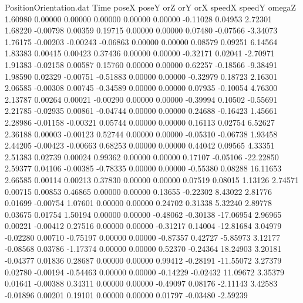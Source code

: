 \begin{filecontents}{PositionOrientation.dat}
Time poseX poseY orZ orY orX speedX speedY omegaZ
   1.60980    0.00000    0.00000     0.00000    0.00000    0.00000   -0.11028    0.04953    2.72301
   1.68220   -0.00798    0.00359     0.19715    0.00000    0.00000    0.07480   -0.07566   -3.34073
   1.76175   -0.00203   -0.00243    -0.06863    0.00000    0.00000    0.08579    0.09251    6.14564
   1.83383    0.00415    0.00423     0.37436    0.00000    0.00000   -0.32171    0.02041   -2.70971
   1.91383   -0.02158    0.00587     0.15760    0.00000    0.00000    0.62257   -0.18566   -9.38491
   1.98590    0.02329   -0.00751    -0.51883    0.00000    0.00000   -0.32979    0.18723    2.16301
   2.06585   -0.00308    0.00745    -0.34589    0.00000    0.00000    0.07935   -0.10054    4.76300
   2.13787    0.00264    0.00021    -0.00290    0.00000    0.00000   -0.39994    0.10502   -0.55691
   2.21785   -0.02935    0.00861    -0.04744    0.00000    0.00000    0.24688   -0.16423    1.45661
   2.28986   -0.01158   -0.00321     0.05744    0.00000    0.00000    0.16113    0.02754    6.52627
   2.36188    0.00003   -0.00123     0.52744    0.00000    0.00000   -0.05310   -0.06738    1.93458
   2.44205   -0.00423   -0.00663     0.68253    0.00000    0.00000    0.44042    0.09565    4.33351
   2.51383    0.02739    0.00024     0.99362    0.00000    0.00000    0.17107   -0.05106  -22.22850
   2.59377    0.04106   -0.00385    -0.78335    0.00000    0.00000   -0.55380    0.08288   16.11653
   2.66585    0.00114    0.00213     0.37830    0.00000    0.00000    0.07519    0.08015    1.13126
   2.74571    0.00715    0.00853     0.46865    0.00000    0.00000    0.13655   -0.22302    8.43022
   2.81776    0.01699   -0.00754     1.07601    0.00000    0.00000    0.24702    0.31338    5.32240
   2.89778    0.03675    0.01754     1.50194    0.00000    0.00000   -0.48062   -0.30138  -17.06954
   2.96965    0.00221   -0.00412     0.27516    0.00000    0.00000   -0.31217    0.14004  -12.81684
   3.04979   -0.02280    0.00710    -0.75197    0.00000    0.00000   -0.87357    0.42727   -5.85973
   3.12177   -0.08568    0.03786    -1.17374    0.00000    0.00000    0.52370   -0.24364   18.24903
   3.20181   -0.04377    0.01836     0.28687    0.00000    0.00000    0.99412   -0.28191  -11.55072
   3.27379    0.02780   -0.00194    -0.54463    0.00000    0.00000   -0.14229   -0.02432   11.09672
   3.35379    0.01641   -0.00388     0.34311    0.00000    0.00000   -0.49097    0.08176   -2.11143
   3.42583   -0.01896    0.00201     0.19101    0.00000    0.00000    0.01797   -0.03480   -2.59239

\end{filecontents}

